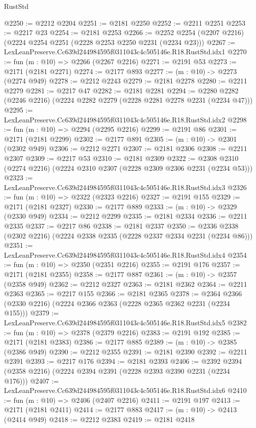 \begin{lexlean}{RustStd}
\begin{coremodule}
@2250 := @2212 @2204
@2251 := @2181 @2250
@2252 := @2211 @2251
@2253 := @2217 @23
@2254 := @2181 @2253
@2266 := @2252 @2254 (@2207 @2216) (@2224 @2254 @2251 (@2228 @2253 @2250 @2231 (@2234 @23)))
@2267 := LexLeanPreserve.Cc639d244984595f0311043c4c505146e.R18.RustStd.idx1
@2270 := fun (m : @10) => @2266 (@2267 @2216)
@2271 := @2191 @53
@2273 := @2171 (@2181 @2271)
@2274 := @2177 @893
@2277 := (m : @10) -> @2273 (@2274 @949)
@2278 := @2212 @2243
@2279 := @2181 @2278
@2280 := @2211 @2279
@2281 := @2217 @47
@2282 := @2181 @2281
@2294 := @2280 @2282 (@2246 @2216) (@2224 @2282 @2279 (@2228 @2281 @2278 @2231 (@2234 @47)))
@2295 := LexLeanPreserve.Cc639d244984595f0311043c4c505146e.R18.RustStd.idx2
@2298 := fun (m : @10) => @2294 (@2295 @2216)
@2299 := @2191 @86
@2301 := @2171 (@2181 @2299)
@2302 := @2177 @891
@2305 := (m : @10) -> @2301 (@2302 @949)
@2306 := @2212 @2271
@2307 := @2181 @2306
@2308 := @2211 @2307
@2309 := @2217 @53
@2310 := @2181 @2309
@2322 := @2308 @2310 (@2274 @2216) (@2224 @2310 @2307 (@2228 @2309 @2306 @2231 (@2234 @53)))
@2323 := LexLeanPreserve.Cc639d244984595f0311043c4c505146e.R18.RustStd.idx3
@2326 := fun (m : @10) => @2322 (@2323 @2216)
@2327 := @2191 @155
@2329 := @2171 (@2181 @2327)
@2330 := @2177 @889
@2333 := (m : @10) -> @2329 (@2330 @949)
@2334 := @2212 @2299
@2335 := @2181 @2334
@2336 := @2211 @2335
@2337 := @2217 @86
@2338 := @2181 @2337
@2350 := @2336 @2338 (@2302 @2216) (@2224 @2338 @2335 (@2228 @2337 @2334 @2231 (@2234 @86)))
@2351 := LexLeanPreserve.Cc639d244984595f0311043c4c505146e.R18.RustStd.idx4
@2354 := fun (m : @10) => @2350 (@2351 @2216)
@2355 := @2191 @176
@2357 := @2171 (@2181 @2355)
@2358 := @2177 @887
@2361 := (m : @10) -> @2357 (@2358 @949)
@2362 := @2212 @2327
@2363 := @2181 @2362
@2364 := @2211 @2363
@2365 := @2217 @155
@2366 := @2181 @2365
@2378 := @2364 @2366 (@2330 @2216) (@2224 @2366 @2363 (@2228 @2365 @2362 @2231 (@2234 @155)))
@2379 := LexLeanPreserve.Cc639d244984595f0311043c4c505146e.R18.RustStd.idx5
@2382 := fun (m : @10) => @2378 (@2379 @2216)
@2383 := @2191 @192
@2385 := @2171 (@2181 @2383)
@2386 := @2177 @885
@2389 := (m : @10) -> @2385 (@2386 @949)
@2390 := @2212 @2355
@2391 := @2181 @2390
@2392 := @2211 @2391
@2393 := @2217 @176
@2394 := @2181 @2393
@2406 := @2392 @2394 (@2358 @2216) (@2224 @2394 @2391 (@2228 @2393 @2390 @2231 (@2234 @176)))
@2407 := LexLeanPreserve.Cc639d244984595f0311043c4c505146e.R18.RustStd.idx6
@2410 := fun (m : @10) => @2406 (@2407 @2216)
@2411 := @2191 @197
@2413 := @2171 (@2181 @2411)
@2414 := @2177 @883
@2417 := (m : @10) -> @2413 (@2414 @949)
@2418 := @2212 @2383
@2419 := @2181 @2418

\end{coremodule}
\end{lexlean}
